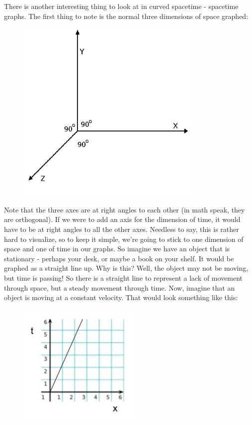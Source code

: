 There is another interesting thing to look at in curved spacetime - spacetime graphs. The first thing to note is the normal three
dimensions of space graphed:
\begin{figure}[H]
\includegraphics[scale=0.5]{3d.jpg}
\end{figure}
Note that the three axes are at right angles to each other (in math speak, they are orthogonal). If we were to add an axis for the
dimension of time, it would have to be at right angles to all the other axes. Needless to say, this is rather hard to visualize,
so to keep it simple, we're going to stick to one dimension of space and one of time in our graphs. So imagine we have an object 
that is stationary - perhaps your desk, or maybe a book on your shelf. It would be graphed as a straight line up. Why is this? 
Well, the object may not be moving, but time is passing! So there is a straight
line to represent a lack of movement through space, but a steady movement through time. Now, imagine that an object is moving at
a constant velocity. That would look something like this:
\begin{figure}[H]
\includegraphics[scale=0.5]{constantv.jpg}
\end{figure}
